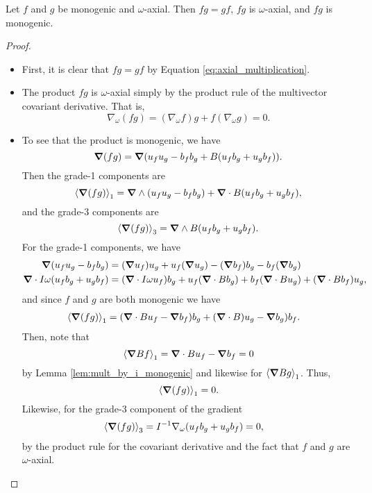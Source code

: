 \documentclass[12pt]{article}
\begin{document}
\begin{proposition}
    Let $f$ and $g$ be monogenic and $\omega$-axial. Then $fg=gf$, $fg$ is $\omega$-axial, and $fg$ is monogenic.
\end{proposition}
\begin{proof}
    \begin{itemize}
        \item First, it is clear that $fg=gf$ by Equation \ref{eq:axial_multiplication}.
        \item The product $fg$ is $\omega$-axial simply by the product rule of the multivector covariant derivative. That is,
        \[
            \nabla_\omega (fg) = (\nabla_\omega f)g + f(\nabla_\omega g) =0.
        \]

    \item 



To see that the product is monogenic, we have
    \[
        \grad(fg) = \grad(u_fu_g - b_f b_g +  B(u_f b_g + u_g b_f)).
    \]
    Then the grade-1 components are
    \[
        \proj{1}{\grad(fg)}=\grad \wedge (u_f u_g - b_f b_g) + \grad \cdot B(u_f b_g + u_g b_f),
    \]
    and the grade-3 components are
    \[
        \proj{3}{\grad(fg)} = \grad \wedge B (u_f b_g + u_g b_f).
    \]
    For the grade-1 components, we have
    \begin{align*}
        \grad(u_f u_g - b_f b_g) &= (\grad u_f) u_g + u_f (\grad u_g) - (\grad b_f) b_g - b_f (\grad b_g)\\
        \grad \cdot I\omega(u_f b_g + u_g b_f) &= (\grad \cdot I\omega u_f) b_g + u_f (\grad \cdot B b_g) + b_f(\grad \cdot B u_g) + (\grad \cdot B b_f) u_g,
    \end{align*}
    and since $f$ and $g$ are both monogenic we have
    \begin{align*}
        \proj{1}{\grad(fg)} &= (\grad \cdot B u_f - \grad  b_f)b_g + (\grad \cdot B) u_g - \grad  b_g)b_f.
    \end{align*}
    Then, note that 
    \[
        \proj{1}{\grad Bf} = \grad \cdot B u_f - \grad b_f=0
    \]
    by Lemma \ref{lem:mult_by_i_monogenic} and likewise for $\proj{1}{\grad Bg}$. Thus,
    \[
        \proj{1}{\grad(fg)}=0.
    \]
    Likewise, for the grade-3 component of the gradient 
    \begin{align*}
        \proj{3}{\grad(fg)} &= I^{-1} \nabla_\omega (u_f b_g + u_g b_f)=0,
    \end{align*}
    by the product rule for the covariant derivative and the fact that $f$ and $g$ are $\omega$-axial.
\end{itemize}
\end{proof}
\end{document}
